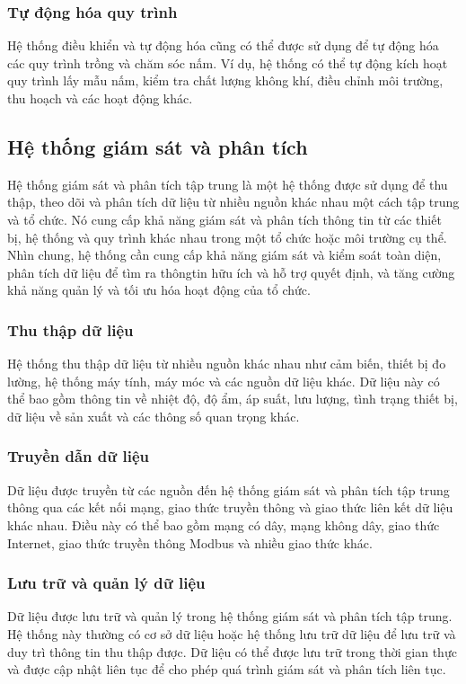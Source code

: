 \subsubsection{Tự động hóa quy trình}
Hệ thống điều khiển và tự động hóa cũng có thể được sử dụng để tự động hóa các quy trình trồng và chăm sóc nấm. Ví dụ, hệ thống có thể tự động kích hoạt quy trình lấy mẫu nấm, kiểm tra chất lượng không khí, điều chỉnh môi trường, thu hoạch và các hoạt động khác.
    
\subsection{Hệ thống giám sát và phân tích}

Hệ thống giám sát và phân tích tập trung là một hệ thống được sử dụng để thu thập, theo dõi và phân tích dữ liệu từ nhiều nguồn khác nhau một cách tập trung và tổ chức. Nó cung cấp khả năng giám sát và phân tích thông tin từ các thiết bị, hệ thống và quy trình khác nhau trong một tổ chức hoặc môi trường cụ thể. Nhìn chung, hệ thống cần cung cấp khả năng giám sát và kiểm soát toàn diện, phân tích dữ liệu để tìm ra thôngtin hữu ích và hỗ trợ quyết định, và tăng cường khả năng quản lý và tối ưu hóa hoạt động của tổ chức.

\subsubsection{Thu thập dữ liệu}
Hệ thống thu thập dữ liệu từ nhiều nguồn khác nhau như cảm biến, thiết bị đo lường, hệ thống máy tính, máy móc và các nguồn dữ liệu khác. Dữ liệu này có thể bao gồm thông tin về nhiệt độ, độ ẩm, áp suất, lưu lượng, tình trạng thiết bị, dữ liệu về sản xuất và các thông số quan trọng khác.

\subsubsection{Truyền dẫn dữ liệu}
Dữ liệu được truyền từ các nguồn đến hệ thống giám sát và phân tích tập trung thông qua các kết nối mạng, giao thức truyền thông và giao thức liên kết dữ liệu khác nhau. Điều này có thể bao gồm mạng có dây, mạng không dây, giao thức Internet, giao thức truyền thông Modbus và nhiều giao thức khác.

\subsubsection{Lưu trữ và quản lý dữ liệu}
Dữ liệu được lưu trữ và quản lý trong hệ thống giám sát và phân tích tập trung. Hệ thống này thường có cơ sở dữ liệu hoặc hệ thống lưu trữ dữ liệu để lưu trữ và duy trì thông tin thu thập được. Dữ liệu có thể được lưu trữ trong thời gian thực và được cập nhật liên tục để cho phép quá trình giám sát và phân tích liên tục.

